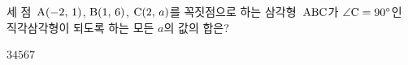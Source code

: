 세 점~$\mathrm{A}(-2,\,1)$, $\mathrm{B}(1,\,6)$, $\mathrm{C}(2,\,a)$를 꼭짓점으로 하는 삼각형~$\mathrm{ABC}$가 $\angle\mathrm{C}=90^\circ$인 직각삼각형이 되도록 하는 모든 $a$의 값의 합은?
\begin{choices32}{$3$}{$4$}{$5$}{$6$}{$7$}\end{choices32}
